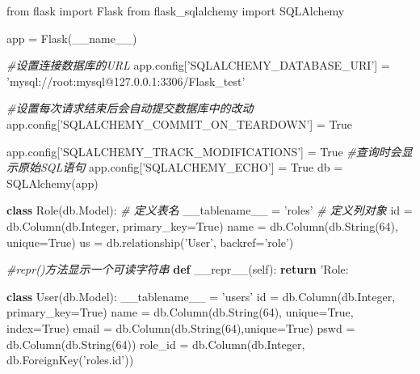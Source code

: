 \documentclass[11pt]{article}
\newenvironment{Shaded}{}{}
\newcommand{\KeywordTok}[1]{\textcolor[rgb]{0.00,0.44,0.13}{\textbf{{#1}}}}
\newcommand{\DecValTok}[1]{\textcolor[rgb]{0.25,0.63,0.44}{{#1}}}
\newcommand{\StringTok}[1]{\textcolor[rgb]{0.25,0.44,0.63}{{#1}}}
\newcommand{\CommentTok}[1]{\textcolor[rgb]{0.38,0.63,0.69}{\textit{{#1}}}}
\newcommand{\FunctionTok}[1]{\textcolor[rgb]{0.02,0.16,0.49}{{#1}}}
\newcommand{\NormalTok}[1]{{#1}}
\newcommand{\SpecialCharTok}[1]{\textcolor[rgb]{0.25,0.44,0.63}{{#1}}}
\newcommand{\ImportTok}[1]{{#1}}
\newcommand{\VariableTok}[1]{\textcolor[rgb]{0.10,0.09,0.49}{{#1}}}
\newcommand{\ControlFlowTok}[1]{\textcolor[rgb]{0.00,0.44,0.13}{\textbf{{#1}}}}
\newcommand{\OperatorTok}[1]{\textcolor[rgb]{0.40,0.40,0.40}{{#1}}}
\newcommand{\BuiltInTok}[1]{{#1}}
\begin{document}
\begin{Shaded}
\begin{Highlighting}[]
\ImportTok{from}\NormalTok{ flask }\ImportTok{import}\NormalTok{ Flask}
\ImportTok{from}\NormalTok{ flask_sqlalchemy }\ImportTok{import}\NormalTok{ SQLAlchemy}


\NormalTok{app }\OperatorTok{=}\NormalTok{ Flask(}\VariableTok{__name__}\NormalTok{)}

\CommentTok{#设置连接数据库的URL}
\NormalTok{app.config[}\StringTok{'SQLALCHEMY_DATABASE_URI'}\NormalTok{] }\OperatorTok{=} \StringTok{'mysql://root:mysql@127.0.0.1:3306/Flask_test'}

\CommentTok{#设置每次请求结束后会自动提交数据库中的改动}
\NormalTok{app.config[}\StringTok{'SQLALCHEMY_COMMIT_ON_TEARDOWN'}\NormalTok{] }\OperatorTok{=} \VariableTok{True}

\NormalTok{app.config[}\StringTok{'SQLALCHEMY_TRACK_MODIFICATIONS'}\NormalTok{] }\OperatorTok{=} \VariableTok{True}
\CommentTok{#查询时会显示原始SQL语句}
\NormalTok{app.config[}\StringTok{'SQLALCHEMY_ECHO'}\NormalTok{] }\OperatorTok{=} \VariableTok{True}
\NormalTok{db }\OperatorTok{=}\NormalTok{ SQLAlchemy(app)}

\KeywordTok{class}\NormalTok{ Role(db.Model):}
    \CommentTok{# 定义表名}
\NormalTok{    __tablename__ }\OperatorTok{=} \StringTok{'roles'}
    \CommentTok{# 定义列对象}
    \BuiltInTok{id} \OperatorTok{=}\NormalTok{ db.Column(db.Integer, primary_key}\OperatorTok{=}\VariableTok{True}\NormalTok{)}
\NormalTok{    name }\OperatorTok{=}\NormalTok{ db.Column(db.String(}\DecValTok{64}\NormalTok{), unique}\OperatorTok{=}\VariableTok{True}\NormalTok{)}
\NormalTok{    us }\OperatorTok{=}\NormalTok{ db.relationship(}\StringTok{'User'}\NormalTok{, backref}\OperatorTok{=}\StringTok{'role'}\NormalTok{)}

    \CommentTok{#repr()方法显示一个可读字符串}
    \KeywordTok{def} \FunctionTok{__repr__}\NormalTok{(}\VariableTok{self}\NormalTok{):}
        \ControlFlowTok{return} \StringTok{'Role:}\SpecialCharTok{%s}\StringTok{'}\OperatorTok{%} \VariableTok{self}\NormalTok{.name}

\KeywordTok{class}\NormalTok{ User(db.Model):}
\NormalTok{    __tablename__ }\OperatorTok{=} \StringTok{'users'}
    \BuiltInTok{id} \OperatorTok{=}\NormalTok{ db.Column(db.Integer, primary_key}\OperatorTok{=}\VariableTok{True}\NormalTok{)}
\NormalTok{    name }\OperatorTok{=}\NormalTok{ db.Column(db.String(}\DecValTok{64}\NormalTok{), unique}\OperatorTok{=}\VariableTok{True}\NormalTok{, index}\OperatorTok{=}\VariableTok{True}\NormalTok{)}
\NormalTok{    email }\OperatorTok{=}\NormalTok{ db.Column(db.String(}\DecValTok{64}\NormalTok{),unique}\OperatorTok{=}\VariableTok{True}\NormalTok{)}
\NormalTok{    pswd }\OperatorTok{=}\NormalTok{ db.Column(db.String(}\DecValTok{64}\NormalTok{))}
\NormalTok{    role_id }\OperatorTok{=}\NormalTok{ db.Column(db.Integer, db.ForeignKey(}\StringTok{'roles.id'}\NormalTok{))}

}
\end{Highlighting}
\end{Shaded}
\end{document}
